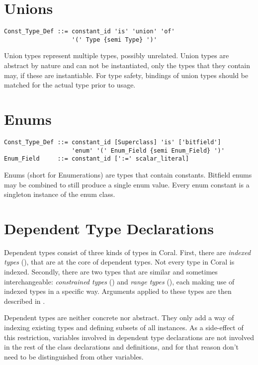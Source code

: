 \section{Unions}
\label{sec:unions}

\syntax\begin{lstlisting}
Const_Type_Def ::= constant_id 'is' 'union' 'of'
                   '(' Type {semi Type} ')'
\end{lstlisting}

Union types represent multiple types, possibly unrelated. Union types are abstract by nature and can not be instantiated, only the types that they contain may, if these are instantiable. For type safety, bindings of union types should be matched for the actual type prior to usage. 

\section{Enums}
\label{sec:enums}

\syntax\begin{lstlisting}
Const_Type_Def ::= constant_id [Superclass] 'is' ['bitfield'] 
                   'enum' '(' Enum_Field {semi Enum_Field} ')'
Enum_Field     ::= constant_id [':=' scalar_literal]
\end{lstlisting}


Enums (short for Enumerations) are types that contain constants. Bitfield enums may be combined to still produce a single enum value. Every enum constant is a singleton instance of the enum class. 

\section{Dependent Type Declarations}
\label{sec:dependent-types-decl}

Dependent types consist of three kinds of types in Coral. First, there are {\em indexed types} (), that are at the core of dependent types. Not every type in Coral is indexed. Secondly, there are two types that are similar and sometimes interchangeable: {\em constrained types} () and {\em range types} (), each making use of indexed types in a specific way. Arguments applied to these types are then described in . 

Dependent types are neither concrete nor abstract. They only add a way of indexing existing types and defining subsets of all instances. As a side-effect of this restriction, variables involved in dependent type declarations are not involved in the rest of the class declarations and definitions, and for that reason don't need to be distinguished from other variables. 

